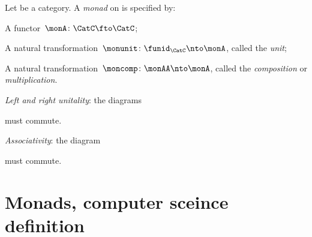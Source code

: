 \begin{ctdefinition}[Monad]
  \label{def:monad}
  Let \CatC be a category. A \emph{monad} on \CatC is specified by:
  \constit
  \begin{compactenum}
    \item A functor~$ \monA \colon \CatC \fto \CatC$;
    \item A natural transformation~$\monunit \colon \funid_\CatC \nto \monA$, called the \emph{unit};
    \item A natural transformation~$\moncomp \colon \monAA \nto \monA$, called the \emph{composition} or \emph{multiplication}.
  \end{compactenum}
  \condit
  \begin{compactenum}
 \item \emph{Left and right unitality}: the diagrams
  \begin{center}
  \end{center}
  must commute. 
  \item \emph{Associativity}: the diagram
  \begin{center}
  \end{center}
  must commute.
  \end{compactenum}
\end{ctdefinition}



\begin{exercise}
\end{exercise}
\begin{solution}
\end{solution}


\section{Monads, computer sceince definition}

